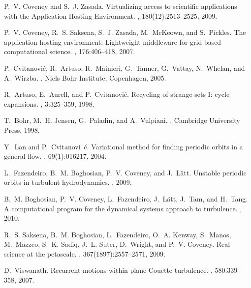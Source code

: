 \begin{thebibliography}{10}

P.~V. Coveney and S.~J. Zasada.
\newblock Virtualizing access to scientific applications with the {Application
  Hosting Environment}.
, 180(12):2513--2525, 2009.

P.~V. Coveney, R.~S. Saksena, S.~J. Zasada, M.~McKeown, and S.~Pickles.
\newblock The application hosting environment: Lightweight middleware for
  grid-based computational science.
, 176:406--418, 2007.

P.~Cvitanovi{\'{c}}, R.~Artuso, R.~Mainieri, G.~Tanner, G.~Vattay, N.~Whelan,
  and A.~Wirzba.
.
\newblock Niels Bohr Institute, Copenhagen, 2005.

R.~Artuso, E.~Aurell, and P.~Cvitanovi{\'{c}}.
\newblock Recycling of strange sets \uppercase{i}: cycle expansions.
, 3:325--359, 1998.

T.~Bohr, M.~H. Jensen, G.~Paladin, and A.~Vulpiani.
.
\newblock Cambridge University Press, 1998.

Y.~Lan and P.~Cvitanovi\ifmmode~\else \'{c}\fi{}.
\newblock Variational method for finding periodic orbits in a general flow.
, 69(1):016217, 2004.

L.~Fazendeiro, B.~M. Boghosian, P.~V. Coveney, and J.~L{\"{a}}tt.
\newblock Unstable periodic orbits in turbulent hydrodynamics.
, 2009.

B.~M. Boghosian, P.~V. Coveney, L.~Fazendeiro, J.~L{\"{a}}tt, J.~Tam, and
  H.~Tang.
\newblock A computational program for the dynamical systems approach to
  turbulence.
, 2010.

R.~S. Saksena, B.~M. Boghosian, L.~Fazendeiro, O.~A. Kenway, S.~Manos,
  M.~Mazzeo, S.~K. Sadiq, J.~L. Suter, D.~Wright, and P.~V. Coveney.
\newblock Real science at the petascale.
, 367(1897):2557--2571, 2009.

D.~Viswanath.
\newblock Recurrent motions within plane {Couette} turbulence.
, 580:339--358, 2007.


\end{thebibliography}
